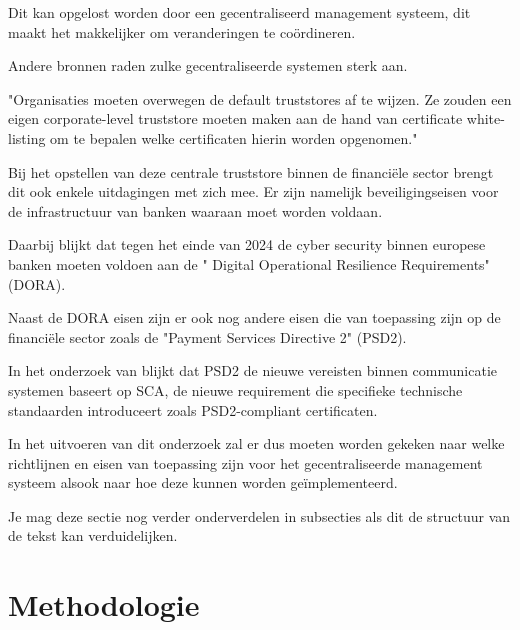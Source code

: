 Dit kan opgelost worden door een gecentraliseerd management systeem, dit maakt het makkelijker om veranderingen te coördineren.

Andere bronnen raden zulke gecentraliseerde systemen sterk aan.

"Organisaties moeten overwegen de default truststores af te wijzen. Ze zouden een eigen corporate-level truststore moeten maken aan de hand van certificate white-listing om te bepalen welke certificaten hierin worden opgenomen." \autocite{Venafi}

Bij het opstellen van deze centrale truststore binnen de financiële sector brengt dit ook enkele uitdagingen met zich mee. Er zijn namelijk beveiligingseisen voor de infrastructuur van banken waaraan moet worden voldaan.

Daarbij blijkt dat tegen het einde van 2024 de cyber security binnen europese banken moeten voldoen aan de " Digital Operational Resilience Requirements" (DORA). \autocite{Gorobeț2024Convergence}

Naast de DORA eisen zijn er ook nog andere eisen die van toepassing zijn op de financiële sector zoals de "Payment Services Directive 2" (PSD2).

In het onderzoek van \textcite{Gounari2024} blijkt dat PSD2 de nieuwe vereisten binnen communicatie systemen baseert op SCA, de nieuwe requirement die specifieke technische standaarden introduceert zoals PSD2-compliant certificaten.

In het uitvoeren van dit onderzoek zal er dus moeten worden gekeken naar welke richtlijnen en eisen van toepassing zijn voor het gecentraliseerde management systeem alsook naar hoe deze kunnen worden geïmplementeerd.


Je mag deze sectie nog verder onderverdelen in subsecties als dit de structuur van de tekst kan verduidelijken.

\section{Methodologie}%
\label{sec:methodologie}

